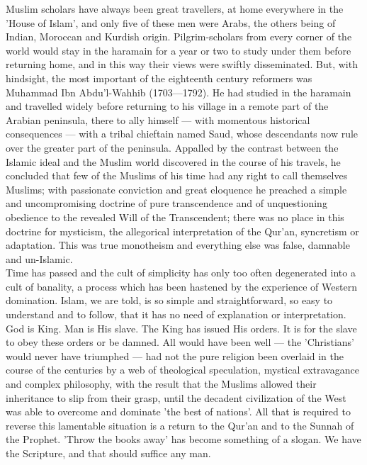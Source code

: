 \documentclass[11pt, b5paper, twoside]{book}
\begin{document}
Muslim scholars have always been great travellers, at home everywhere in the 'House of Islam', and only five of these men were Arabs, the others being of Indian, Moroccan and Kurdish origin. Pilgrim-scholars from every corner of the world would stay in the haramain for a year or two to study under them before returning home, and in this way their views were swiftly disseminated. But, with hindsight, the most important of the eighteenth century reformers was Muhammad Ibn Abdu'l-Wahhib (1703---1792). He had studied in the haramain and travelled widely before returning to his village in a remote part of the Arabian peninsula, there to ally himself --- with momentous historical consequences --- with a tribal chieftain named Saud, whose descendants now rule over the greater part of the peninsula. Appalled by the contrast between the Islamic ideal and the Muslim world discovered in the course of his travels, he concluded that few of the Muslims of his time had any right to call themselves Muslims; with passionate conviction and great eloquence he preached a simple and uncompromising doctrine of pure transcendence and of unquestioning obedience to the revealed Will of the Transcendent; there was no place in this doctrine for mysticism, the allegorical interpretation of the Qur'an, syncretism or adaptation. This was true monotheism and everything else was false, damnable and un-Islamic. \\

Time has passed and the cult of simplicity has only too often degenerated into a cult of banality, a process which has been hastened by the experience of Western domination. Islam, we are told, is so simple and straightforward, so easy to understand and to follow, that it has no need of explanation or interpretation. God is King. Man is His slave. The King has issued His orders. It is for the slave to obey these orders or be damned. All would have been well --- the 'Christians' would never have triumphed --- had not the pure religion been overlaid in the course of the centuries by a web of theological speculation, mystical extravagance and complex philosophy, with the result that the Muslims allowed their inheritance to slip from their grasp, until the decadent civilization of the West was able to overcome and dominate 'the best of nations'. All that is required to reverse this lamentable situation is a return to the Qur'an and to the Sunnah of the Prophet. 'Throw the books away' has become something of a slogan. We have the Scripture, and that should suffice any man. \\
\end{document}
